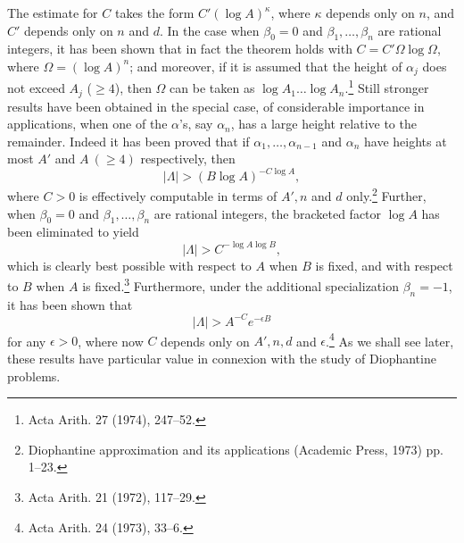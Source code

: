 The estimate for $C$ takes the form $C'(\log A)^\kappa$, where $\kappa$ depends only on $n$, and $C'$ depends only on $n$ and $d$. In the case when $\beta_0 = 0$ and $\beta_1, \dots, \beta_n$ are rational integers, it has been shown that in fact the theorem holds with $C = C'\Omega \log \Omega$, where $\Omega = (\log A)^n$; and moreover, if it is assumed that the height of $\alpha_j$ does not exceed $A_j$ ($\ge 4$), then $\Omega$ can be taken as $\log A_1 \dots \log A_n$.\footnote{Acta Arith. 27 (1974), 247--52.} Still stronger results have been obtained in the special case, of considerable importance in applications, when one of the $\alpha$'s, say $\alpha_n$, has a large height relative to the remainder. Indeed it has been proved that if $\alpha_1, \dots, \alpha_{n-1}$ and $\alpha_n$ have heights at most $A'$ and $A \ (\ge 4)$ respectively, then
\[
|\Lambda| > (B\log A)^{-C\log A},
\]
where $C > 0$ is effectively computable in terms of $A', n$ and $d$ only.\footnote{Diophantine approximation and its applications (Academic Press, 1973) pp. 1--23.} Further, when $\beta_0 = 0$ and $\beta_1, \dots, \beta_n$ are rational integers, the bracketed factor $\log A$ has been eliminated to yield
\[
|\Lambda| > C^{-\log A \log B},
\]
which is clearly best possible with respect to $A$ when $B$ is fixed, and with respect to $B$ when $A$ is fixed.\footnote{Acta Arith. 21 (1972), 117--29.} Furthermore, under the additional specialization $\beta_n = -1$, it has been shown that
\[
|\Lambda| > A^{-C} e^{-\epsilon B}
\]
for any $\epsilon > 0$, where now $C$ depends only on $A', n, d$ and $\epsilon$.\footnote{Acta Arith. 24 (1973), 33--6.} As we shall see later, these results have particular value in connexion with the study of Diophantine problems.

